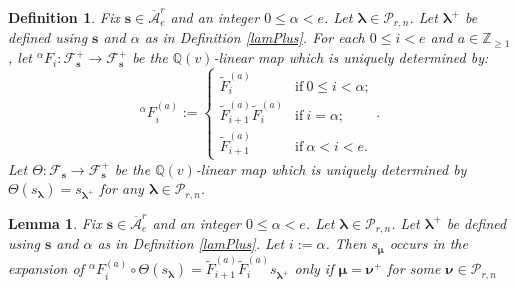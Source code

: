 \documentclass[a4paper,10pt]{amsart}
\theoremstyle{plain}
\def\bs{{\boldsymbol{s}}}
\def\Z{{\mathbb Z}}
\def\Q{{\mathbb{Q}}}
\def\PP{\mathscr{P}}
\def\blam{{\boldsymbol \lambda}}
\def\bmu{{\boldsymbol \mu}}
\def\bnu{{\boldsymbol \nu}}
\theoremstyle{plain}
\newtheorem{lemma}[theorem]{Lemma}
\newtheorem{definition}[theorem]{Definition}
\numberwithin{equation}{section}
\begin{document}
\begin{definition}\label{tildeFi1} Fix $\bs\in \overline{\mathcal A}^r_e$ and an integer $0 \le \alpha < e$. Let $\blam\in\PP_{r,n}$. Let $\blam^+$ be defined using $\bs$ and $\alpha$ as in Definition \ref{lamPlus}. For each $0\leq i<e$ and $a\in \Z_{\geq 1}$, let ${^\alpha}\!F_i: \mathcal F_\bs^+ \to \mathcal F_\bs^+$ be the $\Q(v)$-linear map which is uniquely determined by: 
$$
{^\alpha}\!F^{(a)}_i :=
\begin{cases}
\tilde{F}^{(a)}_i  & \text{if}\ 0\le i<\alpha; \\
\tilde{F}^{(a)}_{i+1} \tilde{F}^{(a)}_i  &\text{if}\ i=\alpha; \\
\tilde{F}^{(a)}_{i+1}  & \text{if}\ \alpha<i<e.
\end{cases}.
$$
Let $\varTheta: \mathcal F_\bs \to \mathcal F_\bs^+$ be the $\Q(v)$-linear map which is uniquely determined by $\varTheta(s_\blam)=s_{\blam^+}$ for any $\blam\in\PP_{r,n}$.
\end{definition}



\begin{lemma}\label{expansion} Fix $\bs\in \overline{\mathcal A}^r_e$ and an integer $0 \le \alpha < e$. Let $\blam\in\PP_{r,n}$. Let $\blam^+$ be defined using $\bs$ and $\alpha$ as in Definition \ref{lamPlus}. Let $i:=\alpha$. Then $s_\bmu$ occurs in the expansion of ${^\alpha}\!F_i^{(a)}\circ \varTheta(s_\blam)=\tilde{F}^{(a)}_{i+1}\tilde{F}^{(a)}_i s_{\blam^+}$ only if $\bmu=\bnu^+$ for some $\bnu\in\PP_{r,n}$
\end{lemma}
\end{document}
